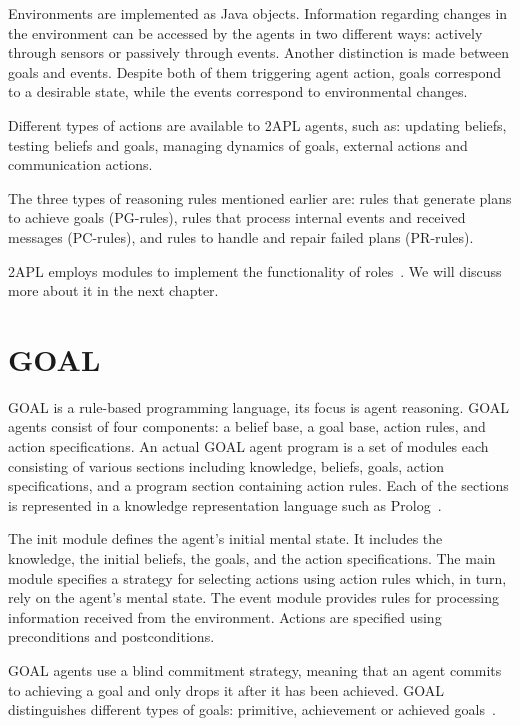 \documentclass[a4paper,12pt,oneside,fleqn]{book} %
\begin{document}
Environments are implemented as Java objects. Information regarding changes in
the environment can be accessed by the agents in two different ways:
actively through sensors or passively through events. Another distinction
is made between goals and events. Despite both of them triggering agent
action, goals correspond to a desirable state, while the events correspond
to environmental changes.

Different types of actions are available to 2APL agents, such as: updating
beliefs, testing beliefs and goals, managing dynamics of goals, external
actions and communication actions.

The three types of reasoning rules mentioned earlier are: rules that
generate plans to achieve goals (PG-rules), rules that process internal
events and received messages (PC-rules), and rules to handle and repair
failed plans (PR-rules).

2APL employs modules to implement the functionality of
roles~\cite{dblp:conf/prima/dastanims08}. We will discuss more about it in
the next chapter.

\section{GOAL} %
GOAL is a rule-based programming language, its focus is agent reasoning.
GOAL agents consist of four components: a belief base, a goal base, action
rules, and action specifications. An actual GOAL agent program is a set of
modules each consisting of various sections including knowledge, beliefs,
goals, action specifications, and a program section containing action
rules. Each of the sections is represented in a knowledge representation
language such as Prolog~\cite{DBLP:books/daglib/0076175}.

The init module defines the agent's initial mental state. It includes the
knowledge, the initial beliefs, the goals, and the action specifications.
The main module specifies a strategy for selecting actions using action
rules which, in turn, rely on the agent's mental state. The event module
provides rules for processing information received from the environment.
Actions are specified using preconditions and postconditions.

GOAL agents use a blind commitment strategy, meaning that an agent commits
to achieving a goal and only drops it after it has been achieved. GOAL
distinguishes different types of goals: primitive, achievement or achieved
goals~\cite{DBLP:conf/jelia/indriksH08}.
\end{document}
